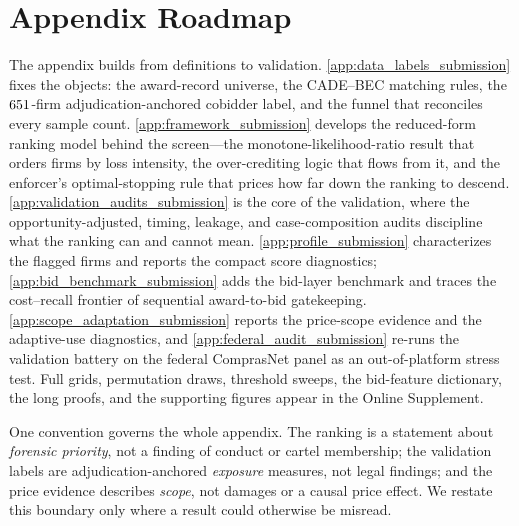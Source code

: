 \section*{Appendix Roadmap}
\label{app:guide_submission}

The appendix builds from definitions to validation.
\ref{app:data_labels_submission} fixes the objects: the award-record
universe, the CADE--BEC matching rules, the $651$-firm
adjudication-anchored cobidder label, and the funnel that reconciles every
sample count. \ref{app:framework_submission} develops the reduced-form
ranking model behind the screen---the monotone-likelihood-ratio result
that orders firms by loss intensity, the over-crediting logic that flows
from it, and the enforcer's optimal-stopping rule that prices how far down
the ranking to descend. \ref{app:validation_audits_submission} is the core
of the validation, where the opportunity-adjusted, timing, leakage, and
case-composition audits discipline what the ranking can and cannot mean.
\ref{app:profile_submission} characterizes the flagged firms and reports
the compact score diagnostics; \ref{app:bid_benchmark_submission} adds the
bid-layer benchmark and traces the cost--recall frontier of sequential
award-to-bid gatekeeping. \ref{app:scope_adaptation_submission} reports the
price-scope evidence and the adaptive-use diagnostics, and
\ref{app:federal_audit_submission} re-runs the validation battery on the
federal ComprasNet panel as an out-of-platform stress test. Full grids,
permutation draws, threshold sweeps, the bid-feature dictionary, the long
proofs, and the supporting figures appear in the Online Supplement.

One convention governs the whole appendix. The ranking is a statement
about \emph{forensic priority}, not a finding of conduct or cartel
membership; the validation labels are adjudication-anchored
\emph{exposure} measures, not legal findings; and the price evidence
describes \emph{scope}, not damages or a causal price effect. We restate
this boundary only where a result could otherwise be misread.
